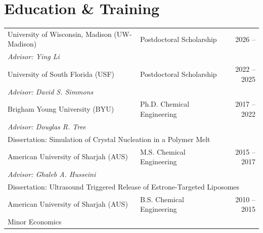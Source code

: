 \documentclass[letterpaper,11pt]{article}
\begin{document}
\section*{Education \& Training}
\begin{tabular}{@{}p{} p{} r@{}}
     University of Wisconsin, Madison (UW-Madison)                                                & Postdoctoral Scholarship                 & 2026 --      \\ [3pt]
     \multicolumn{1}{l}{\emph{Advisor: Ying Li}}                                                  & \multicolumn{1}{l}{}                     &              \\ [8pt]

     University of South Florida (USF)                                                            & Postdoctoral Scholarship                 & 2022 -- 2025 \\ [3pt]
     \multicolumn{1}{l}{\emph{Advisor: David S. Simmons}}                                         & \multicolumn{1}{l}{}                     &              \\ [8pt]

     Brigham Young University (BYU)                                                               & Ph.D. Chemical Engineering               & 2017 -- 2022 \\ [3pt]
     \multicolumn{1}{l}{\emph{Advisor: Douglas R. Tree}}                                          &                                          &              \\ [3pt]
     \multicolumn{3}{l}{Dissertation: Simulation of Crystal Nucleation in a Polymer Melt}                                                                   \\ [8pt]

     American University of Sharjah (AUS)                                                         & M.S. Chemical Engineering                & 2015 -- 2017 \\ [3pt]
     \multicolumn{1}{l}{\emph{Advisor: Ghaleb A. Husseini}}                                       & 					     &              \\ [3pt]
     \multicolumn{3}{l}{Dissertation: Ultrasound Triggered Release of Estrone-Targeted Liposomes}                                                           \\ [8pt]

     American University of Sharjah (AUS)                                                         & B.S. Chemical Engineering                & 2010 -- 2015 \\ [3pt]
     \multicolumn{1}{l}{Minor Economics}                                                          & 				             &              \\ [8pt]
\end{tabular}
\end{document}
